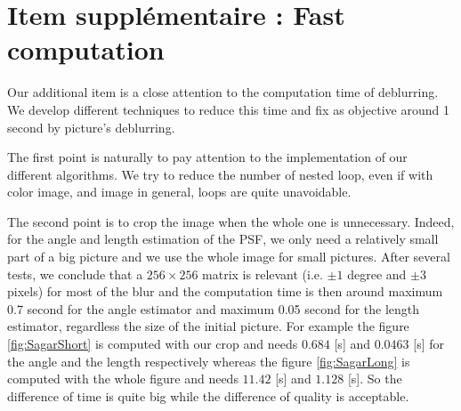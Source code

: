 \section{Item supplémentaire : Fast computation}

Our additional item is a close attention to the computation time of deblurring. 
We develop different techniques to reduce this time and fix as objective around 1 second by picture's deblurring.  

The first point is naturally to pay attention to the implementation of our different algorithms. We try to reduce the number of nested loop, even if with color image, and image in general, loops are quite unavoidable. 

The second point is to crop the image when the whole one is unnecessary. Indeed, for the angle and length estimation of the PSF, we only need a relatively small part of a big picture and we  use the whole image for small pictures. After several tests, we conclude that a $256 \times 256 $ matrix is relevant (i.e. $\pm 1$ degree and $\pm 3$ pixels) for most of the blur and the computation time is then around maximum 0.7 second for the angle estimator and maximum 0.05 second for the length estimator, regardless the size of the initial picture. For example the figure \ref{fig:SagarShort} is computed with our crop and needs $0.684 $ [s] and $0.0463$ [s] for the angle and the length respectively whereas the figure \ref{fig:SagarLong} is computed with the whole figure and needs $11.42$ [s] and $1.128$ [s]. So the difference of time is quite big while the difference of quality is acceptable. 
